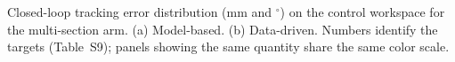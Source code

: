 \caption{Closed-loop tracking error distribution (mm and $^\circ$) on the control workspace for the multi-section arm. (a) Model-based. (b) Data-driven. Numbers identify the targets (Table~S9); panels showing the same quantity share the same color scale.}
